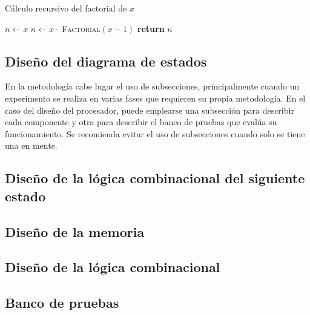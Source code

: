 \documentclass[12pt]{article}
\begin{document}
\begin{center}
    \begin{minipage}[t]{0.5\textwidth}
        \begin{algorithm}[H]
            \caption{Cálculo recursivo del factorial de $x$}\label{alg:factorial}
            \begin{algorithmic}[1]
                    \State $n \gets x$
                \Else
                    \State $n \gets x \cdot $ \textsc{Factorial}$(x-1)$
                \EndIf
                \State \textbf{return} $n$
                \EndProcedure
            \end{algorithmic}
        \end{algorithm}
    \end{minipage}
\end{center}



\subsection{Diseño del diagrama de estados}
En la metodología cabe lugar el uso de subsecciones, principalmente cuando un 
experimento se realiza en varias fases que requieren su propia metodología. En 
el caso del diseño del procesador, puede emplearse una subsección para 
describir cada componente y otra para describir el 
banco de pruebas que evalúa su funcionamiento. Se recomienda evitar el uso 
de subsecciones cuando solo se tiene una en mente.

\subsection{Diseño de la lógica combinacional del siguiente estado}

\subsection{Diseño de la memoria}

\subsection{Diseño de la lógica combinacional}

\subsection{Banco de pruebas}
\end{document}
